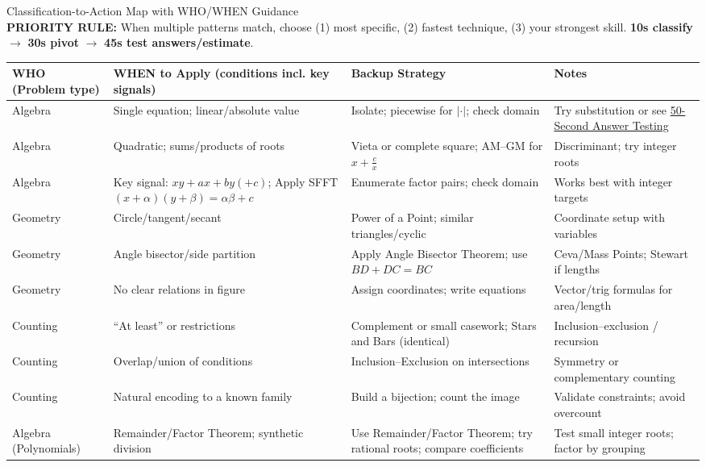 \documentclass{article}
\newcommand{\timer}[1]{\textbf{\textcolor{timegreen}{#1}}}
\begin{document}
\begin{classifybox}{Classification-to-Action Map with WHO/WHEN Guidance}
{\footnotesize\textcolor{timegreen}{}}\\
\textbf{PRIORITY RULE:} When multiple patterns match, choose (1) most specific, (2) fastest technique, (3) your strongest skill. \timer{10s classify} $\rightarrow$ \timer{30s pivot} $\rightarrow$ \timer{45s test answers/estimate}.
\begin{center}
\begin{tabularx}{\textwidth}{|>{\raggedright\arraybackslash}X|>{\raggedright\arraybackslash}X|>{\raggedright\arraybackslash}X|>{\raggedright\arraybackslash}X|}
\hline
\textbf{WHO (Problem type)} & \textbf{WHEN to Apply (conditions incl. key signals)} & \textbf{Backup Strategy} & \textbf{Notes} \\
\hline
Algebra & Single equation; linear/absolute value & Isolate; piecewise for $|\cdot|$; check domain & Try substitution or see \hyperlink{answer-test-50}{50-Second Answer Testing} \\
Algebra & Quadratic; sums/products of roots & Vieta or complete square; AM--GM for $x+\tfrac{c}{x}$ & Discriminant; try integer roots \\
Algebra & Key signal: $xy+ax+by(+c)$; Apply SFFT $(x+\alpha)(y+\beta)=\alpha\beta+c$ & Enumerate factor pairs; check domain & Works best with integer targets \\
Geometry & Circle/tangent/secant & Power of a Point; similar triangles/cyclic & Coordinate setup with variables \\
Geometry & Angle bisector/side partition & Apply Angle Bisector Theorem; use $BD{+}DC=BC$ & Ceva/Mass Points; Stewart if lengths \\
Geometry & No clear relations in figure & Assign coordinates; write equations & Vector/trig formulas for area/length \\
Counting & ``At least'' or restrictions & Complement or small casework; Stars and Bars (identical) & Inclusion--exclusion / recursion \\
Counting & Overlap/union of conditions & Inclusion--Exclusion on intersections & Symmetry or complementary counting \\
Counting & Natural encoding to a known family & Build a bijection; count the image & Validate constraints; avoid overcount \\
Algebra (Polynomials) & Remainder/Factor Theorem; synthetic division & Use Remainder/Factor Theorem; try rational roots; compare coefficients & Test small integer roots; factor by grouping \\

\end{tabularx}
\end{center}
\end{classifybox}
\end{document}
